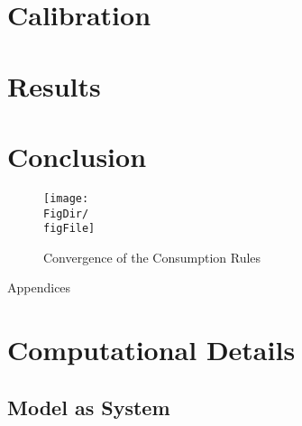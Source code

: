 \documentclass[titlepage]{\econtex}\providecommand{\texname}{BufferStockTheory}
\providecommand{\FigDir}{Figures}
\providecommand{\TableDir}{Tables}
\begin{document}
\hypertarget{Calibration}{}
\section{Calibration}








\hypertarget{Results}{}
\section{Results}


\hypertarget{Conclusion}{}
\section{Conclusion}







\providecommand{\figName}{Convergence-of-the-Consumption-Rules}
\providecommand{\figFile}{cFuncsConverge}
\hypertarget{\figFile}{}
\hypertarget{\figName}{}
\begin{figure}[tbp]
\centerline{\texttt{[image: \\FigDir/\\figFile]}}
\caption{Convergence of the Consumption Rules}
\label{fig:\figFile}
\end{figure}














\clearpage\vfill\eject

\appendix

\centerline{\LARGE Appendices}\vspace{0.2in}




\clearpage\vfill\eject

\normalsize


\hypertarget{Computational Details}{}
\section{Computational Details}


\hypertarget{Model as System}{}
\subsection{Model as System}
\end{document}
